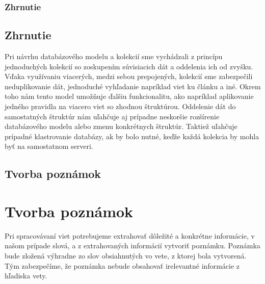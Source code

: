 %
%
{
	\subsubsection{Zhrnutie}
}
{
	\subsection{Zhrnutie}
}
\label{subsubsection:collections_summary}
Pri návrhu databázového modelu a kolekcií sme vychádzali z princípu jednoduchých kolekcií so zoskupením súvisiacich dát a oddelenia ich od zvyšku. Vďaka využívaniu viacerých, medzi sebou prepojených, kolekcií sme zabezpečili neduplikovanie dát, jednoduché vyhľadanie napríklad viet ku článku a iné. Okrem toho nám tento model umožňuje ďalšiu funkcionalitu, ako napríklad aplikovanie jedného pravidla na viacero viet so zhodnou štruktúrou. Oddelenie dát do samostatných štruktúr nám uľahčuje aj prípadne neskoršie rozšírenie databázového modelu alebo zmenu konkrétnych štruktúr. Taktiež uľahčuje prípadné klastrovanie databázy, ak by bolo nutné, keďže každá kolekcia by mohla byť na samostatnom serveri.

%
%
{
	\subsection{Tvorba poznámok}
}
{
	\section{Tvorba poznámok}
}
\label{subsection:notes_creation}
Pri spracovávaní viet potrebujeme extrahovať dôležité a konkrétne informácie, v našom prípade slová, a z extrahovaných informácií vytvoriť poznámku. Poznámka bude zložená výhradne zo slov obsiahnutých vo vete, z ktorej bola vytvorená. Tým zabezpečíme, že poznámka nebude obsahovať irelevantné informácie z hľadiska vety. 

